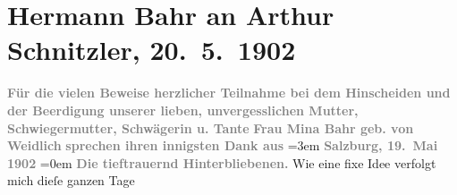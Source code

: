 

         
         \renewcommand{\erwaehntePersonen}{Personen: Wilhelmine Bahr}
         \renewcommand{\erwaehnteOrte}{Orte: Salzburg, Wien}
         \renewcommand{\erwaehnteWerke}{Werke: Lebendige Stunden (Vier Einacter von Arthur Schnitzler: »Lebendige Stunden«, »Die Frau mit dem Dolche«, »Die letzten Masken« und »Literatur«. Zum ersten Male aufgeführt im Carl-Theater am 6. Mai 1902. Erste Vorstellung des Berliner Deutschen Theaters), Lebendige Stunden. Vier Einakter}
               \section[Hermann Bahr an Arthur Schnitzler, 20. 5. 1902]{ Hermann Bahr an Arthur Schnitzler, 20. 5. 1902}\nopagebreak{}\rehead{ }\begin{ledgroupsized}[t]{13cm}\normalsize\beginnumbering \toendnotes[C]{\smallbreak\pagebreak[2]} 
\toendnotes[C]{\smallbreak}\pstart
           \noindent{}{\pb}\textcolor{gray}{\textbf{Für die vielen Beweise herzlicher Teilnahme bei dem
                     Hinscheiden und der Beerdigung unserer lieben, unvergesslichen Mutter,
                     Schwiegermutter, Schwägerin u. Tante}}\pend
           \pstart
           \textcolor{gray}{\textbf{Frau Mina Bahr geb. von
                        Weidlich}}\pend
           \pstart
           \textcolor{gray}{\textbf{sprechen ihren innigsten Dank aus}}\pend
           \leftskip=3em{}\pstart
           \noindent{}\textcolor{gray}{\textbf{Salzburg, 19. Mai
                        1902}}\pend
           \leftskip=0em{}\pstart
           \noindent{}\raggedleft{}\textcolor{gray}{\textbf{Die tieftrauernd Hinterbliebenen.}}\pend
           \pstart
           {\pb}Wie eine fixe Idee verfolgt mich dieſe ganzen Tage

\end{ledgroupsized}
